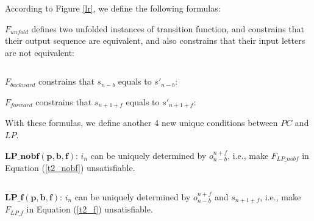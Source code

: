 \documentclass[journal]{IEEEtran}
\begin{document}
According to Figure \ref{lr},
we define the following formulas:

$F_{unfold}$ defines two unfolded instances of transition function,
and constrains that their output sequence are equivalent,
and also constrains that their input letters are not equivalent:

\begin{equation}\label{F_unfold}
\end{equation}

$F_{backward}$ constrains that $s_{n-b}$ equals to $s'_{n-b}$:
\begin{equation}\label{F_b}
\end{equation}

$F_{forward}$ constrains that $s_{n+1+f}$ equals to $s'_{n+1+f}$:
\begin{equation}\label{F_f}
\end{equation}


With these formulas,
we define another 4 new unique conditions between $PC$ and $LP$.


\textbf{$\boldsymbol{LP\_nobf(p,b,f)}$}:
$i_n$ can be uniquely determined by $o_{n-b}^{n+f}$,
i.e.,
make $F_{LP\_nobf}$ in Equation (\ref{t2_nobf}) unsatisfiable.

\begin{equation}\label{t2_nobf}
\end{equation}

\textbf{$\boldsymbol{LP\_f(p,b,f)}$}:
$i_n$ can be uniquely determined by $o_{n-b}^{n+f}$ and $s_{n+1+f}$,
i.e.,
make $F_{LP\_f}$ in Equation (\ref{t2_f}) unsatisfiable.
\end{document}
